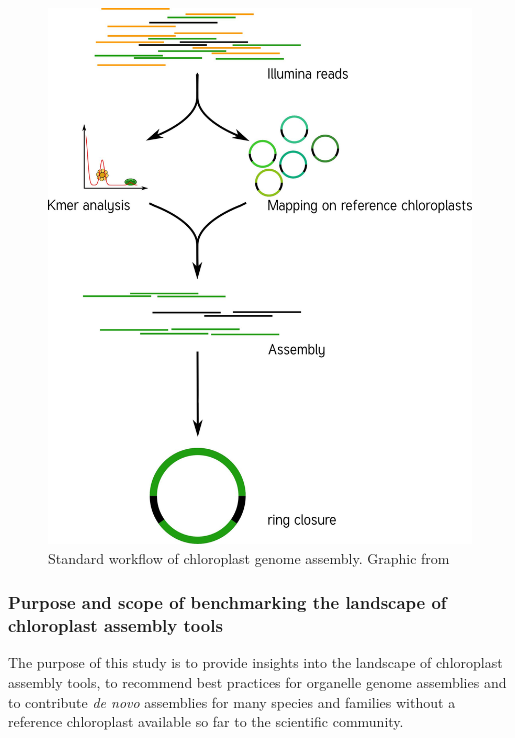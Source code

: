 \begin{figure}[H]
\centering
\includegraphics[height=.65\textheight, width=.95\textwidth]{Figures/CE_workflow}
\decoRule
\caption[Chloroplast genome assembly workflow]{Standard workflow of chloroplast genome assembly. Graphic from \cite{j_ankenbrand_chloroextractor:_2018} }
\label{fig:cpast_workflow}
\end{figure}

\subsubsection{Purpose and scope of benchmarking the landscape of chloroplast assembly tools}

The purpose of this study is to provide insights into the landscape of chloroplast
assembly tools, to recommend best practices for organelle genome assemblies and to
contribute \textit{de novo} assemblies for many species and families without a reference
chloroplast available so far to the scientific community. \\



